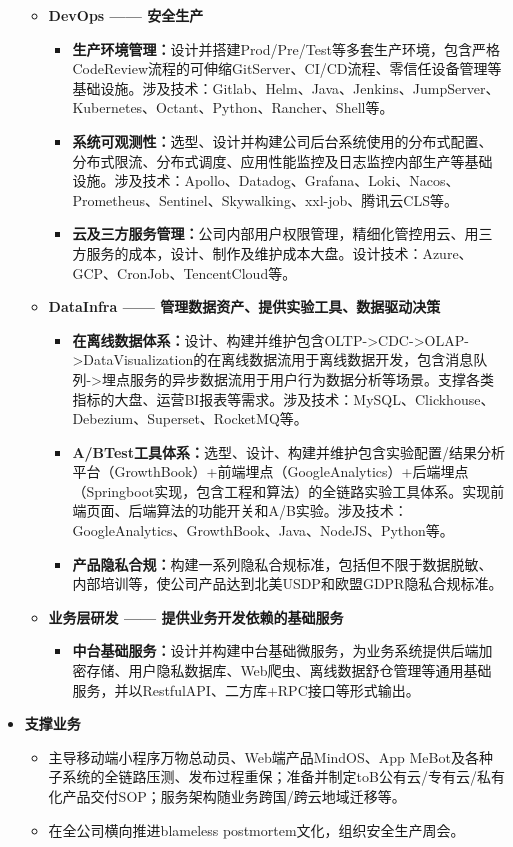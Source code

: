 \documentclass[letterpaper,11pt]{article}
\begin{document}
\begin{spacing}{1.0}
\begin{itemize}
\begin{itemize}
				\item \textbf{DevOps —— 安全生产}
				\begin{itemize}
					\item \textbf{生产环境管理：}设计并搭建Prod/Pre/Test等多套生产环境，包含严格CodeReview流程的可伸缩GitServer、CI/CD流程、零信任设备管理等基础设施。涉及技术：Gitlab、Helm、Java、Jenkins、JumpServer、Kubernetes、Octant、Python、Rancher、Shell等。
					\item \textbf{系统可观测性：}选型、设计并构建公司后台系统使用的分布式配置、分布式限流、分布式调度、应用性能监控及日志监控内部生产等基础设施。涉及技术：Apollo、Datadog、Grafana、Loki、Nacos、Prometheus、Sentinel、Skywalking、xxl-job、腾讯云CLS等。
					\item \textbf{云及三方服务管理：}公司内部用户权限管理，精细化管控用云、用三方服务的成本，设计、制作及维护成本大盘。设计技术：Azure、GCP、CronJob、TencentCloud等。
				\end{itemize}
				
				\item \textbf{DataInfra —— 管理数据资产、提供实验工具、数据驱动决策}
				\begin{itemize}
					\item     \textbf{在离线数据体系：}设计、构建并维护包含OLTP->CDC->OLAP->DataVisualization的在离线数据流用于离线数据开发，包含消息队列->埋点服务的异步数据流用于用户行为数据分析等场景。支撑各类指标的大盘、运营BI报表等需求。涉及技术：MySQL、Clickhouse、Debezium、Superset、RocketMQ等。
					\item
					\textbf{A/BTest工具体系：}选型、设计、构建并维护包含实验配置/结果分析平台（GrowthBook）+前端埋点（GoogleAnalytics）+后端埋点（Springboot实现，包含工程和算法）的全链路实验工具体系。实现前端页面、后端算法的功能开关和A/B实验。涉及技术：GoogleAnalytics、GrowthBook、Java、NodeJS、Python等。
					\item
					\textbf{产品隐私合规：}构建一系列隐私合规标准，包括但不限于数据脱敏、内部培训等，使公司产品达到北美USDP和欧盟GDPR隐私合规标准。
				\end{itemize}
				
				\item \textbf{业务层研发 —— 提供业务开发依赖的基础服务}
				\begin{itemize}
					\item \textbf{中台基础服务：}设计并构建中台基础微服务，为业务系统提供后端加密存储、用户隐私数据库、Web爬虫、离线数据舒仓管理等通用基础服务，并以RestfulAPI、二方库+RPC接口等形式输出。
				\end{itemize}
			\end{itemize}
			\item \textbf{支撑业务}
			\begin{itemize}
				\item 主导移动端小程序万物总动员、Web端产品MindOS、App MeBot及各种子系统的全链路压测、发布过程重保；准备并制定toB公有云/专有云/私有化产品交付SOP；服务架构随业务跨国/跨云地域迁移等。
				\item 在全公司横向推进blameless postmortem文化，组织安全生产周会。
			\end{itemize}
		\end{itemize}
		

\end{spacing}
\end{document}
